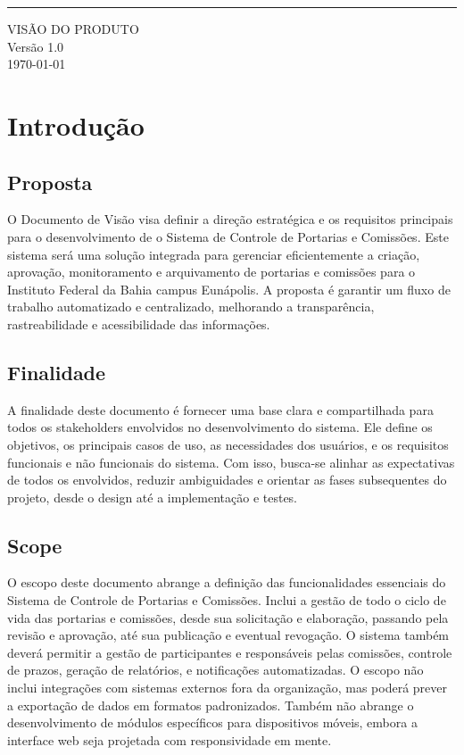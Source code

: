 \documentclass{scrreprt}
\date{}
\def\myversion{1.0 }
\begin{document}
\begin{flushright}
    \rule{14cm}{5pt}\vskip1cm
    \begin{bfseries}
        \Huge{VISÃO DO PRODUTO}\\
        \vspace{4.5cm}
        \LARGE{Versão \myversion}\\
        \vspace{6cm}
        \today\\
    \end{bfseries}
\end{flushright}

\tableofcontents

\chapter{Introdução}

\section{Proposta}

O Documento de Visão visa definir a direção estratégica e os requisitos principais para o desenvolvimento de o Sistema de Controle de Portarias e Comissões. Este sistema será uma solução integrada para gerenciar eficientemente a criação, aprovação, monitoramento e arquivamento de portarias e comissões para o Instituto Federal da Bahia campus Eunápolis. A proposta é garantir um fluxo de trabalho automatizado e centralizado, melhorando a transparência, rastreabilidade e acessibilidade das informações.

\section{Finalidade}
A finalidade deste documento é fornecer uma base clara e compartilhada para todos os stakeholders envolvidos no desenvolvimento do sistema. Ele define os objetivos, os principais casos de uso, as necessidades dos usuários, e os requisitos funcionais e não funcionais do sistema. Com isso, busca-se alinhar as expectativas de todos os envolvidos, reduzir ambiguidades e orientar as fases subsequentes do projeto, desde o design até a implementação e testes.

\section{Scope}
O escopo deste documento abrange a definição das funcionalidades essenciais do Sistema de Controle de Portarias e Comissões. Inclui a gestão de todo o ciclo de vida das portarias e comissões, desde sua solicitação e elaboração, passando pela revisão e aprovação, até sua publicação e eventual revogação. O sistema também deverá permitir a gestão de participantes e responsáveis pelas comissões, controle de prazos, geração de relatórios, e notificações automatizadas.
\newline
O escopo não inclui integrações com sistemas externos fora da organização, mas poderá prever a exportação de dados em formatos padronizados. Também não abrange o desenvolvimento de módulos específicos para dispositivos móveis, embora a interface web seja projetada com responsividade em mente.
\end{document}
